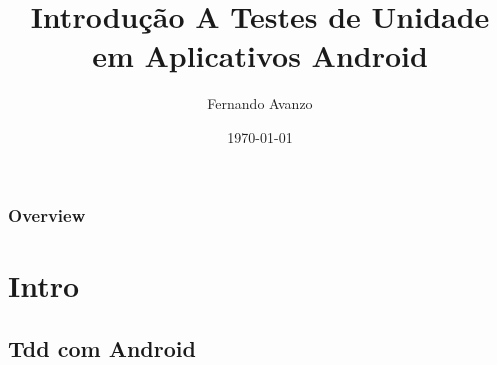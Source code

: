 \documentclass{beamer}
\title[TDD com Android]{Introdução A Testes de Unidade em Aplicativos Android}
\author{Fernando Avanzo} %
\institute[] 
{ %
\medskip
\textit{fernando.avanzo@gmail.com} %
}
\date{\today} %
\begin{document}
\begin{frame}
\titlepage %
\end{frame}

\begin{frame}
\frametitle{Overview} 
\tableofcontents %
\end{frame}

\section{Intro} %

\subsection{Tdd com Android} %
\end{document}

